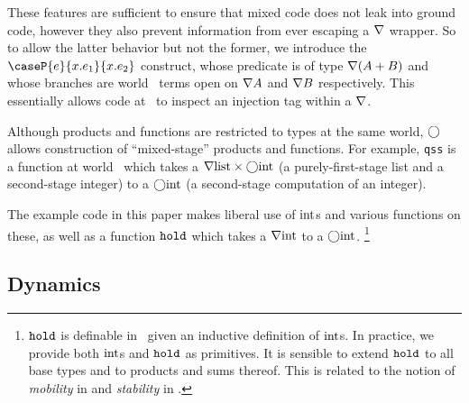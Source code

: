 \begin{abstrsyn}
These features are sufficient to ensure that mixed code does not leak into ground code,
however they also prevent information from ever escaping a $\nabla$ wrapper.
So to allow the latter behavior but not the former, we introduce the $\caseP{e}{x.e_1}{x.e_2}$ construct, 
whose predicate is of type $\nabla(A+B)$ and
whose branches are world \bbonem\ terms open on $\nabla{A}$ and $\nabla{B}$ respectively. 
This essentially allows code at \bbonem\ to inspect an injection tag within a $\nabla$.

Although products and functions are restricted to types at the same world,
$\bigcirc$ allows construction of ``mixed-stage'' products and functions.
For example, \texttt{qss} is a function at world \bbonem\ which takes a
$\nabla{\rm list} \times \bigcirc{\rm int}$ (a purely-first-stage list and a
second-stage integer) to a $\bigcirc{\rm int}$ (a second-stage
computation of an integer).

The example code in this paper makes liberal use of ${\rm int}$s and various
functions on these, as well as a function ${\tt hold}$ which takes a $\nabla{\rm int}$
to a $\bigcirc{\rm int}$.%
\footnote{${\tt hold}$ is definable in \lang\ given an inductive definition of
${\rm int}$s. In practice, we provide both ${\rm int}$s and ${\tt hold}$ as primitives.
It is sensible to extend ${\tt hold}$ to all base types and to products and sums
thereof. This is related to the notion of {\em mobility} in \cite{murphy05} and
{\em stability} in \cite{krishnaswami13}.}

\end{abstrsyn}


\subsection{Dynamics}
\label{sec:dynamics}

